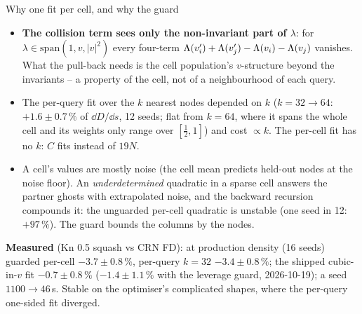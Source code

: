 \begin{frame}{Why one fit per cell, and why the guard}
\begin{itemize}
\item \textbf{The collision term sees only the non-invariant part of $\lambda$}: for
  $\lambda\in\mathrm{span}(1, v, |v|^2)$ every four-term $\Lambda(v_i')+\Lambda(v_j')-\Lambda(v_i)-\Lambda(v_j)$ vanishes.  What the
  pull-back needs is the cell population's $v$-structure beyond the invariants -- a property of the
  cell, not of a neighbourhood of each query.
\item The per-query fit over the $k$ nearest nodes depended on $k$ ($k = 32\to64$: $+1.6\pm0.7\,\%$ of $\dd D/\dd s$,
  12 seeds; flat from $k = 64$, where it spans the whole cell and its weights only range over $[\frac12, 1]$)
  and cost $\propto k$.  The per-cell fit has no $k$: $C$ fits instead of $19N$.
\item A cell's values are mostly noise (the cell mean predicts held-out nodes at the noise floor).  An
  \emph{underdetermined} quadratic in a sparse cell answers the partner ghosts with extrapolated noise, and the
  backward recursion compounds it: the unguarded per-cell quadratic is unstable (one seed in 12: $+97\,\%$).
  The guard bounds the columns by the nodes.
\end{itemize}
\textbf{Measured} (Kn 0.5 squash vs CRN FD): at production density (16 seeds) guarded per-cell $-3.7\pm0.8\,\%$,
per-query $k = 32$ $-3.4\pm0.8\,\%$; the shipped cubic-in-$v$ fit $-0.7\pm0.8\,\%$ ($-1.4\pm1.1\,\%$ with the leverage guard, 2026-10-19); a seed $1100\to46$\,s.  Stable on the optimiser's complicated shapes, where
the per-query one-sided fit diverged.
\end{frame}

